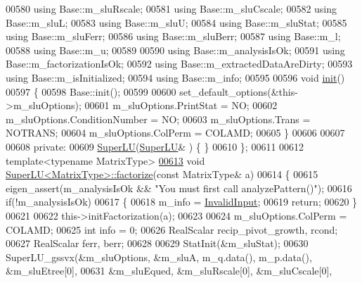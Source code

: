 \begin{DoxyCode}
00580     \textcolor{keyword}{using} Base::m\_sluRscale;
00581     \textcolor{keyword}{using} Base::m\_sluCscale;
00582     \textcolor{keyword}{using} Base::m\_sluL;
00583     \textcolor{keyword}{using} Base::m\_sluU;
00584     \textcolor{keyword}{using} Base::m\_sluStat;
00585     \textcolor{keyword}{using} Base::m\_sluFerr;
00586     \textcolor{keyword}{using} Base::m\_sluBerr;
00587     \textcolor{keyword}{using} Base::m\_l;
00588     \textcolor{keyword}{using} Base::m\_u;
00589     
00590     \textcolor{keyword}{using} Base::m\_analysisIsOk;
00591     \textcolor{keyword}{using} Base::m\_factorizationIsOk;
00592     \textcolor{keyword}{using} Base::m\_extractedDataAreDirty;
00593     \textcolor{keyword}{using} Base::m\_isInitialized;
00594     \textcolor{keyword}{using} Base::m\_info;
00595     
00596     \textcolor{keywordtype}{void} \hyperlink{structinit}{init}()
00597     \{
00598       Base::init();
00599       
00600       set\_default\_options(&this->m\_sluOptions);
00601       m\_sluOptions.PrintStat        = NO;
00602       m\_sluOptions.ConditionNumber  = NO;
00603       m\_sluOptions.Trans            = NOTRANS;
00604       m\_sluOptions.ColPerm          = COLAMD;
00605     \}
00606     
00607     
00608   \textcolor{keyword}{private}:
00609     \hyperlink{class_eigen_1_1_super_l_u}{SuperLU}(\hyperlink{class_eigen_1_1_super_l_u}{SuperLU}& ) \{ \}
00610 \};
00611 
00612 \textcolor{keyword}{template}<\textcolor{keyword}{typename} MatrixType>
\hyperlink{class_eigen_1_1_super_l_u_a0b5a5fbda1a1f368003c7c01021a4636}{00613} \textcolor{keywordtype}{void} \hyperlink{class_eigen_1_1_super_l_u_a0b5a5fbda1a1f368003c7c01021a4636}{SuperLU<MatrixType>::factorize}(\textcolor{keyword}{const} MatrixType& a)
00614 \{
00615   eigen\_assert(m\_analysisIsOk && \textcolor{stringliteral}{"You must first call analyzePattern()"});
00616   \textcolor{keywordflow}{if}(!m\_analysisIsOk)
00617   \{
00618     m\_info = \hyperlink{group__enums_gga85fad7b87587764e5cf6b513a9e0ee5ea945604f62795ffc70aedf2bd12ea0434}{InvalidInput};
00619     \textcolor{keywordflow}{return};
00620   \}
00621   
00622   this->initFactorization(a);
00623   
00624   m\_sluOptions.ColPerm = COLAMD;
00625   \textcolor{keywordtype}{int} info = 0;
00626   RealScalar recip\_pivot\_growth, rcond;
00627   RealScalar ferr, berr;
00628 
00629   StatInit(&m\_sluStat);
00630   SuperLU\_gssvx(&m\_sluOptions, &m\_sluA, m\_q.data(), m\_p.data(), &m\_sluEtree[0],
00631                 &m\_sluEqued, &m\_sluRscale[0], &m\_sluCscale[0],

\end{DoxyCode}

